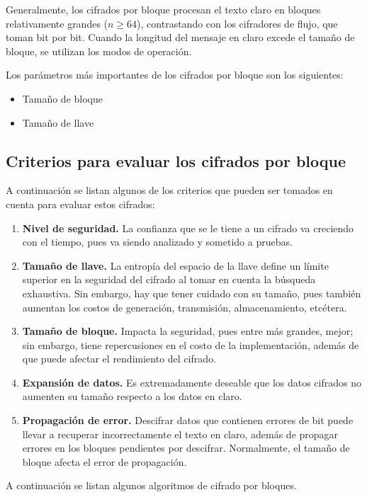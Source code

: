 Generalmente, los cifrados por bloque procesan el texto claro en bloques
relativamente grandes ($n \geq 64$), contrastando con los cifradores de
flujo, que toman bit por bit. Cuando la longitud del mensaje en claro excede 
el tamaño de bloque, se utilizan los modos de operación.

Los parámetros más importantes de los cifrados por bloque son los
siguientes:
\begin{itemize}
	\item Tamaño de bloque
	\item Tamaño de llave
\end{itemize}

\subsection{Criterios para evaluar los cifrados por bloque}

A continuación se listan algunos de los criterios que pueden ser tomados 
en cuenta para evaluar estos cifrados:
\begin{enumerate}
	\item \textbf{Nivel de seguridad.} La confianza que se le tiene a un
		cifrado va creciendo con el tiempo, pues va siendo analizado y
		sometido a pruebas.
	\item \textbf{Tamaño de llave.} La entropía del espacio de la llave
		define un límite superior en la seguridad del cifrado al tomar en
		cuenta la búsqueda exhaustiva. Sin embargo, hay que tener cuidado
		con su tamaño, pues también aumentan los costos de generación,
		transmisión, almacenamiento, etcétera.
	\item \textbf{Tamaño de bloque.} Impacta la seguridad, pues entre más
		grandes, mejor; sin embargo, tiene repercusiones en el costo de la
		implementación, además de que puede afectar el rendimiento del
		cifrado.
	\item \textbf{Expansión de datos.} Es extremadamente deseable que los
		datos cifrados no aumenten su tamaño respecto a los datos en claro.
	\item \textbf{Propagación de error.} Descifrar datos que contienen
		errores de bit puede llevar a recuperar incorrectamente el texto en
		claro, además de propagar errores en los bloques pendientes por
		descifrar. Normalmente, el tamaño de bloque afecta el error de
		propagación.
\end{enumerate}

A continuación se listan algunos algoritmos de cifrado por bloques.








